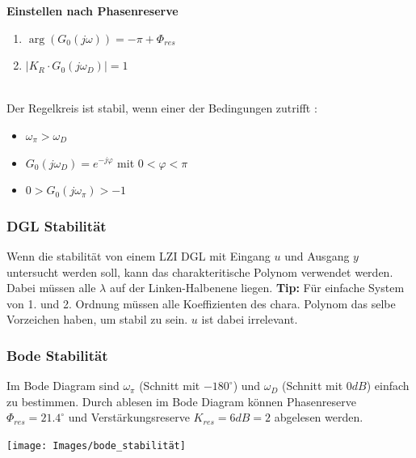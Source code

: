 \noindent\textbf{Einstellen nach Phasenreserve}
\begin{enumerate}[nosep]
	\item $\arg(G_0(j\omega)) = -\pi + \Phi_{res}$
	\item $\left|K_R \cdot G_0(j\omega_D)\right| = 1$
\end{enumerate}

~\\
\noindent Der Regelkreis ist stabil, wenn einer der Bedingungen zutrifft :
\begin{itemize}[nosep]
	\item $\omega_\pi > \omega_D$
	\item $G_0(j\omega_D) = e^{-j\varphi}$ mit $0 < \varphi < \pi$
	\item $0 > G_0(j\omega_\pi) > -1$
\end{itemize}

\subsubsection{DGL Stabilität}
Wenn die stabilität von einem LZI DGL mit Eingang $u$ und Ausgang $y$ untersucht werden soll, kann das charakteritische Polynom verwendet werden. Dabei müssen alle $\lambda$ auf der Linken-Halbenene liegen. \textbf{Tip:} Für einfache System von 1. und 2. Ordnung müssen alle Koeffizienten des chara. Polynom das selbe Vorzeichen haben, um stabil zu sein. $u$ ist dabei irrelevant.

\subsubsection{Bode Stabilität}
 Im Bode Diagram sind $\omega_\pi$ (Schnitt mit $-180^\circ$) und $\omega_D$ (Schnitt mit $0dB$) einfach zu bestimmen. Durch ablesen im Bode Diagram können Phasenreserve $\Phi_{res} = 21.4^\circ$ und Verstärkungsreserve $K_{res} = 6dB = 2$ abgelesen werden.
\begin{center}
	\texttt{[image: Images/bode\_stabilität]}
\end{center}
